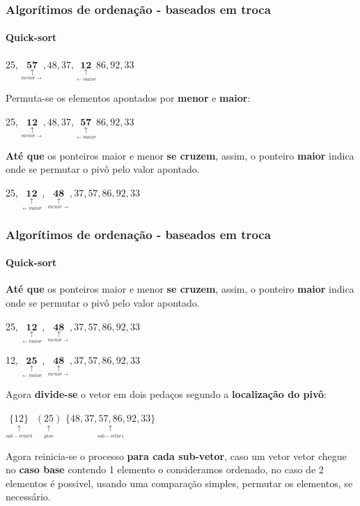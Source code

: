 \begin{frame}
	\frametitle{Algorítimos de ordenação - baseados em troca}
	\framesubtitle{Quick-sort}
	
	\par 25, $\underset{\underset{menor \rightarrow}{\uparrow}}{\mathbf{57}}, 48, 37, \underset{\underset{\leftarrow maior}{\uparrow}}{\mathbf{12}} 86, 92, 33 $\newline
	
	\par Permuta-se os elementos apontados por \textbf{menor} e \textbf{maior}:
	\par 25, $\underset{\underset{menor \rightarrow}{\uparrow}}{\mathbf{12}}, 48, 37, \underset{\underset{\leftarrow maior}{\uparrow}}{\mathbf{57}} 86, 92, 33 $\newline
	
	\par \textbf{Até que} os ponteiros maior e menor \textbf{se cruzem}, assim, o ponteiro \textbf{maior} indica onde se permutar o pivô pelo valor apontado.
	\par 25, $\underset{\underset{\leftarrow maior}{\uparrow}}{\mathbf{12}}$, $\underset{\underset{menor \rightarrow}{\uparrow}}{\mathbf{48}}, 37, 57, 86, 92, 33 $
\end{frame}

\begin{frame}
	\frametitle{Algorítimos de ordenação - baseados em troca}
	\framesubtitle{Quick-sort}
	
	\par \textbf{Até que} os ponteiros maior e menor \textbf{se cruzem}, assim, o ponteiro \textbf{maior} indica onde se permutar o pivô pelo valor apontado.
	\par 25, $\underset{\underset{\leftarrow maior}{\uparrow}}{\mathbf{12}}$, $\underset{\underset{menor \rightarrow}{\uparrow}}{\mathbf{48}}, 37, 57, 86, 92, 33 $\newline
	
	\par 12, $\underset{\underset{\leftarrow maior}{\uparrow}}{\mathbf{25}}$, $\underset{\underset{menor \rightarrow}{\uparrow}}{\mathbf{48}}, 37, 57, 86, 92, 33 $\newline
	
	\par Agora \textbf{divide-se} o vetor em dois pedaços segundo a \textbf{localização do pivô}:
	\par $\underset{\underset{sub-vetor0}{\uparrow}}{\{12\}}$ $\underset{\underset{pivo}{\uparrow}}{(25)}$ $\underset{\underset{sub-vetor1}{\uparrow}}{\{48, 37, 57, 86, 92, 33\}} $\newline
		
	\par Agora reinicia-se o processo \textbf{para cada sub-vetor}, caso um vetor vetor chegue no \textbf{caso base} contendo 1 elemento o consideramos ordenado, no caso de 2 elementos é possivel, usando uma comparação simples, permutar os elementos, se necessário.
\end{frame}

